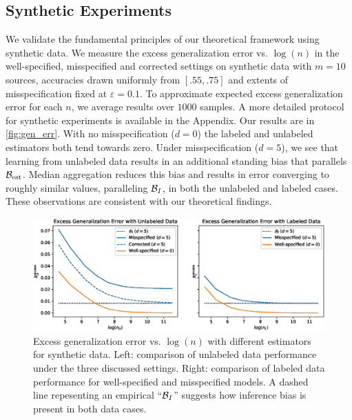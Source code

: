 
\vspace{-0.5em}
\subsection{Synthetic Experiments}
\vspace{-0.5em}
We validate the fundamental principles of our theoretical framework using synthetic data. We measure the excess generalization error vs. $\log(n)$ in the well-specified, misspecified and corrected settings on synthetic data with $m=10$ sources, accuracies drawn uniformly from $[.55, .75]$ and extents of misspecification fixed at $\varepsilon=0.1$. To approximate expected excess generalization error for each $n$, we average results over $1000$ samples. A more detailed protocol for synthetic experiments is available in the Appendix.
Our results are in \autoref{fig:gen_err}. With no misspecification ($d=0$) the labeled and unlabeled estimators both tend towards zero. Under misspecification ($d=5$), we see that learning from unlabeled data results in an additional standing bias that parallels $\mathcal{B}_{\mathrm{est}}$. Median aggregation reduces this bias and results in error converging to roughly similar values, paralleling $\mathcal{B}_I$, in both the unlabeled and labeled cases. These observations are consistent with our theoretical findings.

\begin{figure}
    \centering
    \includegraphics[width=.48\textwidth]{eps_figures/biases.eps}
    \caption{Excess generalization error vs. $\log(n)$ with different estimators for synthetic data. Left: comparison of unlabeled data performance under the three discussed settings. Right: comparison of labeled data performance for well-specified and misspecified models. A dashed line repesenting an empirical ``$\mathcal{B}_I$'' suggests how inference bias is present in both data cases. %
    }
    \label{fig:gen_err}
\end{figure}